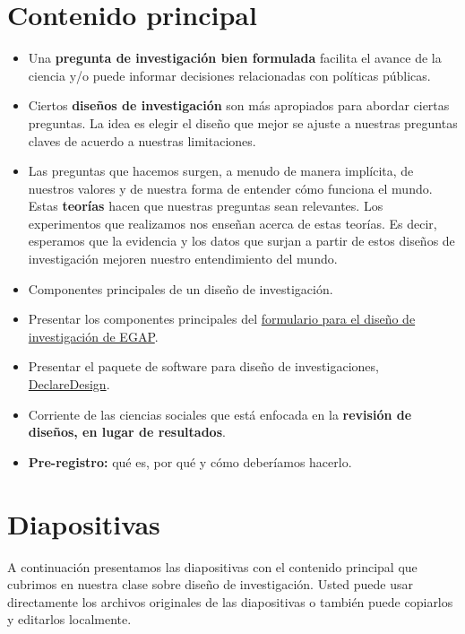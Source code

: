 \documentclass[12pt,spanish,]{book}
\begin{document}
\hypertarget{contenido-principal}{%
\section{Contenido principal}\label{contenido-principal}}

\begin{itemize}
\item
  Una \textbf{pregunta de investigación bien formulada} facilita el avance de la ciencia y/o puede informar decisiones relacionadas con políticas públicas.
\item
  Ciertos \textbf{diseños de investigación} son más apropiados para abordar ciertas preguntas. La idea es elegir el diseño que mejor se ajuste a nuestras preguntas claves de acuerdo a nuestras limitaciones.
\item
  Las preguntas que hacemos surgen, a menudo de manera implícita, de nuestros valores y de nuestra forma de entender cómo funciona el mundo. Estas \textbf{teorías} hacen que nuestras preguntas sean relevantes. Los experimentos que realizamos nos enseñan acerca de estas teorías. Es decir, esperamos que la evidencia y los datos que surjan a partir de estos diseños de investigación mejoren nuestro entendimiento del mundo.
\item
  Componentes principales de un diseño de investigación.
\item
  Presentar los componentes principales del \href{https://egap.github.io/learningdays-resources/Exercises/design-form.html}{formulario para el diseño de investigación de EGAP}.
\item
  Presentar el paquete de software para diseño de investigaciones, \href{http://declaredesign.org}{DeclareDesign}.
\item
  Corriente de las ciencias sociales que está enfocada en la \textbf{revisión de diseños, en lugar de resultados}.
\item
  \textbf{Pre-registro:} qué es, por qué y cómo deberíamos hacerlo.
\end{itemize}

\hypertarget{diapositivas}{%
\section{Diapositivas}\label{diapositivas}}

A continuación presentamos las diapositivas con el contenido principal que cubrimos en nuestra clase sobre diseño de investigación. Usted puede usar directamente los archivos originales de las diapositivas o también puede copiarlos y editarlos localmente.
\end{document}
